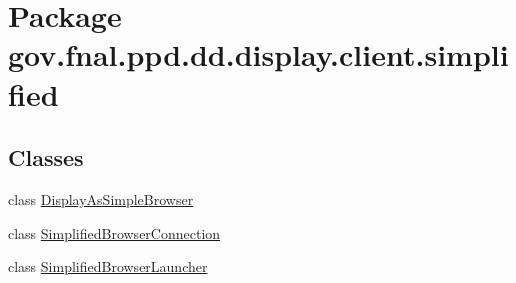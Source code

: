 \hypertarget{namespacegov_1_1fnal_1_1ppd_1_1dd_1_1display_1_1client_1_1simplified}{\section{Package gov.\-fnal.\-ppd.\-dd.\-display.\-client.\-simplified}
\label{namespacegov_1_1fnal_1_1ppd_1_1dd_1_1display_1_1client_1_1simplified}
}
\subsection*{Classes}
\begin{DoxyCompactItemize}
\item 
class \hyperlink{classgov_1_1fnal_1_1ppd_1_1dd_1_1display_1_1client_1_1simplified_1_1DisplayAsSimpleBrowser}{Display\-As\-Simple\-Browser}
\item 
class \hyperlink{classgov_1_1fnal_1_1ppd_1_1dd_1_1display_1_1client_1_1simplified_1_1SimplifiedBrowserConnection}{Simplified\-Browser\-Connection}
\item 
class \hyperlink{classgov_1_1fnal_1_1ppd_1_1dd_1_1display_1_1client_1_1simplified_1_1SimplifiedBrowserLauncher}{Simplified\-Browser\-Launcher}
\end{DoxyCompactItemize}
